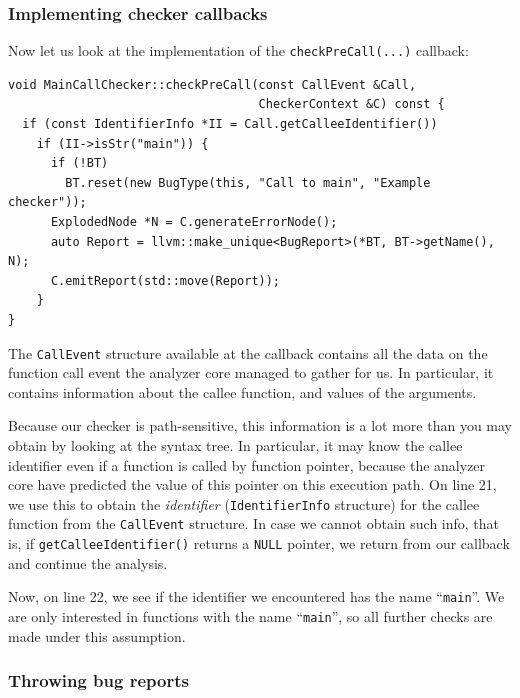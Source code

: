 \documentclass[a4paper,12pt]{article}
\newenvironment{nobr}{\begin{minipage}{\textwidth}\setlength\parskip{1em}
}{\end{minipage}\ignorespacesafterend}
\begin{document}
\begin{nobr}
\subsubsection{Implementing checker callbacks}

Now let us look at the implementation of the \lstinline|checkPreCall(...)| callback:
\begin{lstlisting}[style=cplusplus,firstnumber=19]
void MainCallChecker::checkPreCall(const CallEvent &Call,
                                   CheckerContext &C) const {
  if (const IdentifierInfo *II = Call.getCalleeIdentifier())
    if (II->isStr("main")) {
      if (!BT)
        BT.reset(new BugType(this, "Call to main", "Example checker"));
      ExplodedNode *N = C.generateErrorNode();
      auto Report = llvm::make_unique<BugReport>(*BT, BT->getName(), N);
      C.emitReport(std::move(Report));
    }
}
\end{lstlisting}
\end{nobr}

The \lstinline|CallEvent| structure available at the callback contains all the data on the function call event the analyzer core managed to gather for us. In particular, it contains information about the callee function, and values of the arguments.

Because our checker is path-sensitive, this information is a lot more than you may obtain by looking at the syntax tree. In particular, it may know the callee identifier even if a function is called by function pointer, because the analyzer core have predicted the value of this pointer on this execution path. On line 21, we use this to obtain the \emph{identifier} (\lstinline|IdentifierInfo| structure) for the callee function from the \lstinline|CallEvent| structure. In case we cannot obtain such info, that is, if \lstinline|getCalleeIdentifier()| returns a \lstinline|NULL| pointer, we return from our callback and continue the analysis.

Now, on line 22, we see if the identifier we encountered has the name ``\lstinline|main|''. We are only interested in functions with the name ``\lstinline|main|'', so all further checks are made under this assumption.

\subsubsection{Throwing bug reports}
\end{document}
